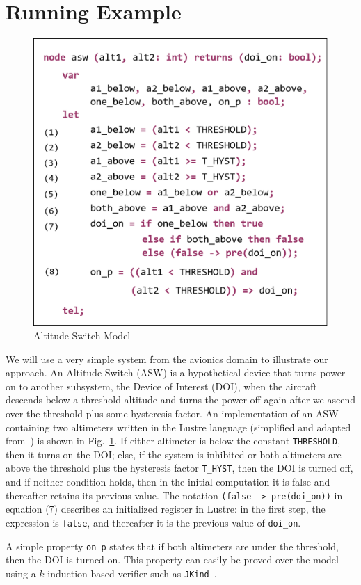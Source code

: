 \section{Running Example}
\label{sec:example}


\begin{figure}
\centering
\includegraphics[width=0.8\columnwidth]{figs/aswcode.png}
\vspace{-0.1in}
\caption{Altitude Switch Model }
\label{fig:asw}
\vspace{-0.2in}
\end{figure}

We will use a very simple system from the avionics domain to illustrate our approach. An Altitude Switch (ASW) is a hypothetical device that turns power on to another subsystem, the Device of Interest (DOI), when the aircraft descends below a threshold altitude and turns the power off again after we ascend over the threshold plus some hysteresis factor.  An implementation of an ASW containing two altimeters written in the Lustre language (simplified and adapted from~\cite{HCW02:ase-deviation}) is shown in Fig.~\ref{fig:asw}.  If either altimeter is below the constant \texttt{THRESHOLD}, then it turns on the DOI; else, if the system is inhibited or both altimeters are above the threshold plus the hysteresis factor \small{\texttt{T\_HYST}}, then the DOI is turned off, and if neither condition holds, then in the initial computation it is false and thereafter retains its previous value.  The notation \small{\texttt{(false -> pre(doi\_on))}} in equation (7) describes an initialized register in Lustre: in the first step, the expression is \small{\texttt{false}}, and thereafter it is the previous value of \small{\texttt{doi\_on}}.

A simple property \small{\texttt{on\_p}} states that if both altimeters are under the threshold, then the DOI is turned on.  This property can easily be proved over the model using a $k$-induction based verifier such as \texttt{JKind}~\cite{jkind}.


